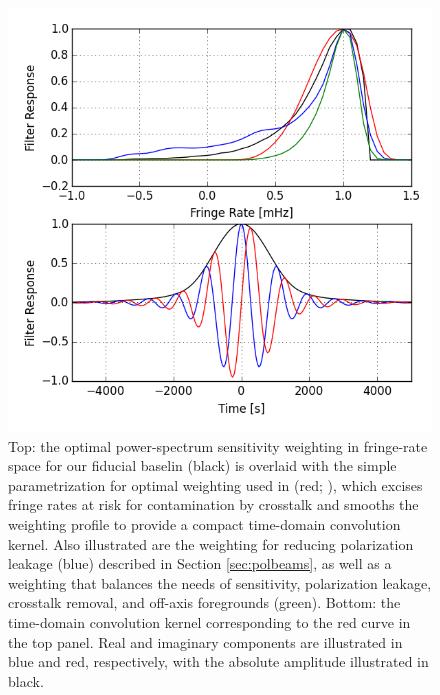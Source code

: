 \documentclass[twocolumn,apj,numberedappendix]{emulateapj}
\begin{document}
\begin{figure}[!t]
\centering
\includegraphics[width=\columnwidth]{plots/fringe_rate_cut.png}
\caption{
Top: the optimal power-spectrum sensitivity weighting in fringe-rate space 
for our fiducial baselin (black) is overlaid with
the simple parametrization for optimal weighting used in (red; \citealt{ali_et_al2015}),
which excises fringe rates at risk for contamination by crosstalk and smooths the
weighting profile to provide a compact time-domain convolution kernel.  Also illustrated
are the weighting for reducing polarization leakage (blue) described in Section \ref{sec:polbeams}, as well
as a weighting that balances the needs of sensitivity, polarization leakage, crosstalk
removal, and off-axis foregrounds (green).  Bottom: the time-domain convolution kernel
corresponding to the red curve in the top panel.  Real and imaginary components are
illustrated in blue and red, respectively, with the absolute amplitude illustrated
in black.
}
\label{fig:fringe_rate_cut}
\end{figure}
\end{document}
